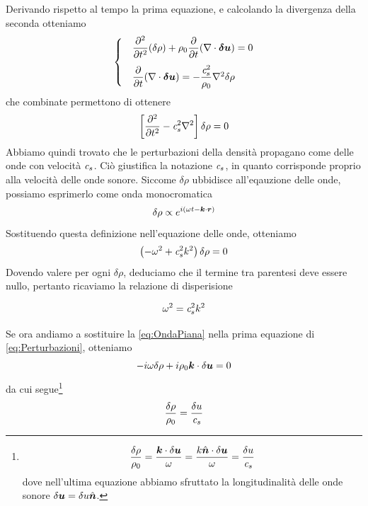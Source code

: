 Derivando rispetto al tempo la prima equazione, e calcolando la divergenza della seconda otteniamo
\begin{align}
\begin{cases}
&\derPn{}{t}{2}(\delta\rho) + \rho_0 \derP{}{t}(\Div \delta\V{u}) = 0 \\[10pt]
&\derP{}{t} (\Div\delta\V{u}) = -\dfrac{\sound^2}{\rho_0}\Grad^2\delta\rho
\end{cases}
\end{align}
che combinate permettono di ottenere
\begin{equation}
\left[ \derPn{}{t}{2} - \sound^2 \Grad^2 \right] \delta \rho = 0 \label{eq:OndeSonore}
\end{equation}
Abbiamo quindi trovato che le perturbazioni della densità propagano come delle onde con velocità $\textit{c}_{s}$. Ciò giustifica la notazione $\textit{c}_{s}$, in quanto corrisponde proprio alla velocità delle onde sonore. Siccome $\delta\rho$ ubbidisce all'eqauzione delle onde, possiamo esprimerlo come onda monocromatica 
\begin{equation}
\delta \rho \propto e^{i(\omega t - \scal{k}{r})} \label{eq:OndaPiana}
\end{equation}
Sostituendo questa definizione nell'equazione delle onde, otteniamo
\begin{align*}
\left( -\omega^2 +\textit{c}_{s}^2 k^2 \right) \delta \rho =0
\end{align*}
Dovendo valere per ogni $\delta \rho$, deduciamo che il termine tra parentesi deve essere nullo, pertanto ricaviamo la relazione di disperisione
\begin{EQ}
\begin{equation}
\omega^2 = \textit{c}_{s}^2 k^2  \label{eq:Dispersione}
\end{equation}
\end{EQ}
Se ora andiamo a sostituire la \ref{eq:OndaPiana} nella prima equazione di \ref{eq:Perturbazioni}, otteniamo 
\begin{equation}
-i \omega \delta \rho  + i \rho_0 \V{k}\cdot \delta \V{u} = 0
\end{equation}
da cui segue\footnote{
\begin{align*}
\dfrac{\delta\rho}{\rho_0} = \dfrac{\V{k}\cdot \delta \V{u}}{\omega} = \dfrac{k\V{\hat{n}}\cdot \delta \V{u}}{\omega} = \dfrac{\delta u}{\sound}
\end{align*}
dove nell'ultima equazione abbiamo sfruttato la longitudinalità delle onde sonore $\delta\V{u} = \delta u \V{\hat{n}}$.
}
\begin{equation}
\dfrac{\delta\rho}{\rho_0} =  \dfrac{\delta u}{\textit{c}_{s}}
\end{equation}
